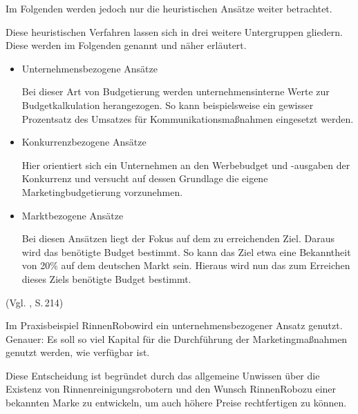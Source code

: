     \noindent
    Im Folgenden werden jedoch nur die heuristischen Ansätze weiter betrachtet.

    \noindent
    Diese heuristischen Verfahren lassen sich in drei weitere Untergruppen gliedern. Diese werden im Folgenden genannt
    und näher erläutert.

    \begin{itemize}
        \item Unternehmensbezogene Ansätze
            
            Bei dieser Art von Budgetierung werden unternehmensinterne Werte zur Budgetkalkulation herangezogen. So kann
            beispielsweise ein gewisser Prozentsatz des Umsatzes für Kommunikationsmaßnahmen eingesetzt werden.

        \item Konkurrenzbezogene Ansätze
        
            Hier orientiert sich ein Unternehmen an den Werbebudget und -ausgaben der Konkurrenz und versucht auf dessen
            Grundlage die eigene Marketingbudgetierung vorzunehmen.

        \item Marktbezogene Ansätze
        
            Bei diesen Ansätzen liegt der Fokus auf dem zu erreichenden Ziel. Daraus wird das benötigte Budget bestimmt.
            So kann das Ziel etwa eine Bekanntheit von 20\% auf dem deutschen Markt sein. Hieraus wird nun das zum
            Erreichen dieses Ziels benötigte Budget bestimmt.
    \end{itemize} (Vgl. \cite{Bruhn2014a}, S.\,214)

    \noindent
    Im Praxisbeispiel \as RinnenRobo\adl wird ein unternehmensbezogener Ansatz genutzt. Genauer: Es soll so viel
    Kapital für die Durchführung der Marketingmaßnahmen genutzt werden, wie verfügbar ist.

    \noindent
    Diese Entscheidung ist begründet durch das allgemeine Unwissen über die Existenz von Rinnenreinigungsrobotern und
    den Wunsch \as RinnenRobo\adl zu einer bekannten Marke zu entwickeln, um auch höhere Preise rechtfertigen zu
    können.

